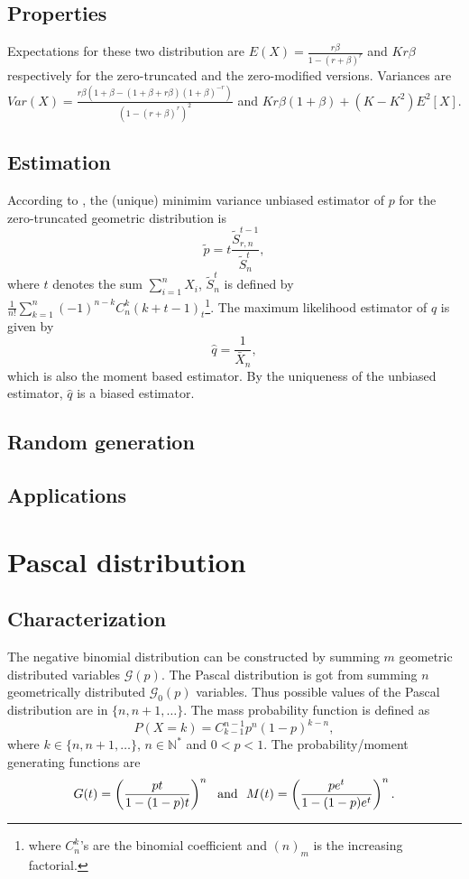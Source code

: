 \subsection{Properties}
Expectations for these two distribution are $E(X) = \frac{ r \beta}{1-(r+\beta)^r}$ and $Kr \beta$ respectively for the zero-truncated and the zero-modified versions. Variances are $Var(X)=\frac{ r\beta(1+\beta -(1+\beta+r\beta)(1+\beta)^{-r} )}{(1-(r+\beta)^r)^2}$ and $ Kr\beta(1+\beta)+(K-K^2)E^2[X]$.

\subsection{Estimation}
According to \cite{cacoullos}, the (unique) minimim variance unbiased estimator of $p$ for the zero-truncated geometric distribution is 
$$
\tilde p = t \frac{\tilde S_{r,n}^{t-1}}{\tilde S_n^t},
$$
where $t$ denotes the sum $\sum_{i=1}^n X_i$, $\tilde S_n^t$ is defined by $\frac{1}{n!}\sum_{k=1}^n(-1)^{n-k} C_n^k(k+t-1)_t$\footnote{where $C_n^k$'s are the binomial coefficient and $(n)_m$ is the increasing factorial.}. The maximum likelihood estimator of $q$ is given by
$$
\hat q = \frac{1}{\bar X_n},
$$
which is also the moment based estimator. By the uniqueness of the unbiased estimator, $\hat q$ is a biased estimator.

\subsection{Random generation}
\subsection{Applications}

\section{Pascal distribution}
\subsection{Characterization}
The negative binomial distribution can be constructed by summing $m$ geometric distributed variables $\mathcal G(p)$. The Pascal distribution is got from summing $n$ geometrically distributed $\mathcal G_0(p)$ variables. Thus possible values of the Pascal distribution are in $\{n, n+1,\dots\}$. The mass probability function is defined as
$$
P(X=k) = C_{k-1}^{n-1} p^n(1-p)^{k-n} ,
$$
where $k\in \{n, n+1, \dots \}$, $n\in \mathbb N^*$ and $0<p<1$. The probability/moment generating functions are 
$$
G(t) = \left(\frac{pt}{1-(1-p)t}\right)^n \textrm{~~and~~} M(t) =\left(\frac{pe^{t}}{1-(1-p)e^{t}}\right)^n.
 $$

